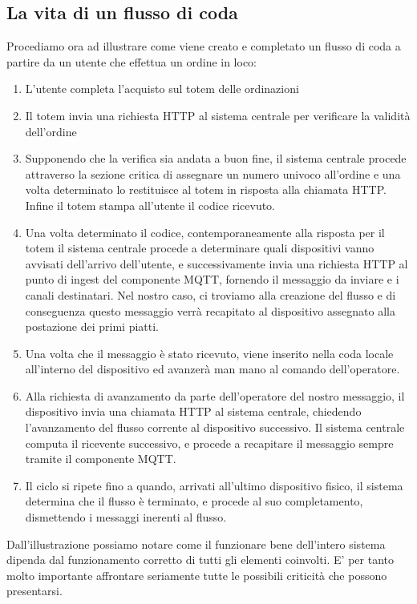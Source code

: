 \documentclass[a4paper, titlepage, 12pt, openright, twoside]{book}
\begin{document}
\subsection{La vita di un flusso di coda}
Procediamo ora ad illustrare come viene creato e completato un flusso di coda a partire da un utente che effettua un ordine in loco:
\begin{enumerate}
	\item L'utente completa l'acquisto sul totem delle ordinazioni
	\item Il totem invia una richiesta HTTP al sistema centrale per verificare la validità dell'ordine
	\item Supponendo che la verifica sia andata a buon fine, il sistema centrale procede attraverso la sezione critica di assegnare un numero univoco all'ordine
		  e una volta determinato lo restituisce al totem in risposta alla chiamata HTTP. Infine il totem stampa all'utente il codice ricevuto.
	\item Una volta determinato il codice, contemporaneamente alla risposta per il totem il sistema centrale procede a determinare quali dispositivi vanno avvisati dell'arrivo dell'utente, e successivamente invia una richiesta HTTP al punto di ingest del componente MQTT, fornendo il messaggio da inviare e i canali destinatari. Nel nostro caso, ci troviamo alla creazione del flusso e di conseguenza questo messaggio verrà recapitato al dispositivo assegnato alla postazione dei primi piatti.
	\item Una volta che il messaggio è stato ricevuto, viene inserito nella coda locale all'interno del dispositivo ed avanzerà man mano al comando dell'operatore.
	\item Alla richiesta di avanzamento da parte dell'operatore del nostro messaggio, il dispositivo invia una chiamata HTTP al sistema centrale, chiedendo l'avanzamento del flusso
		  corrente al dispositivo successivo. Il sistema centrale computa il ricevente successivo, e procede a recapitare il messaggio sempre tramite il componente MQTT.
	\item Il ciclo si ripete fino a quando, arrivati all'ultimo dispositivo fisico, il sistema determina che il flusso è terminato, e procede al suo completamento,
		  dismettendo i messaggi inerenti al flusso. 
\end{enumerate}

Dall'illustrazione possiamo notare come il funzionare bene dell'intero sistema dipenda dal funzionamento corretto di tutti gli elementi coinvolti. E' per tanto molto importante affrontare seriamente tutte le possibili criticità che possono presentarsi.
\end{document}
